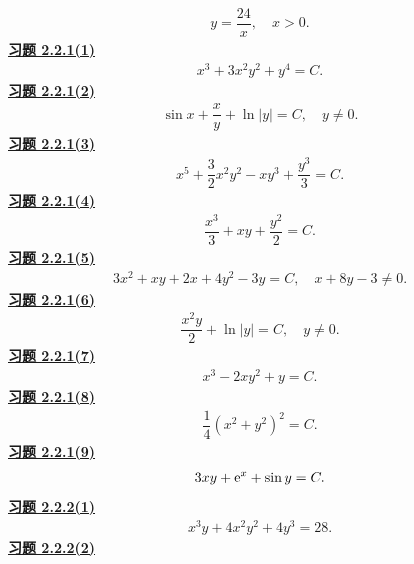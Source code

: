 \[\begin{gathered}y=\dfrac{24}{x},\quad x>0.\end{gathered}\]
\noindent\textbf{\hyperref[q:2.2.1(1)]{习题 2.2.1(1)}}
\[\begin{gathered}x^3+3x^2y^2+y^4=C.\end{gathered}\]
\noindent\textbf{\hyperref[q:2.2.1(2)]{习题 2.2.1(2)}}
\[\begin{gathered}\sin x+\dfrac xy+\ln|y|=C,\quad y\ne0.\end{gathered}\]
\noindent\textbf{\hyperref[q:2.2.1(3)]{习题 2.2.1(3)}}
\[\begin{gathered}x^5+\dfrac32x^2y^2-xy^3+\dfrac{y^3}{3}=C.\end{gathered}\]
\noindent\textbf{\hyperref[q:2.2.1(4)]{习题 2.2.1(4)}}
\[\begin{gathered}\dfrac{x^3}{3}+xy+\dfrac{y^2}{2}=C.\end{gathered}\]
\noindent\textbf{\hyperref[q:2.2.1(5)]{习题 2.2.1(5)}}
\[\begin{gathered}3x^2+xy+2x+4y^2-3y=C,\quad x+8y-3\ne0.\end{gathered}\]
\noindent\textbf{\hyperref[q:2.2.1(6)]{习题 2.2.1(6)}}
\[\begin{gathered}\dfrac{x^2y}{2}+\ln|y|=C,\quad y\ne0.\end{gathered}\]
\noindent\textbf{\hyperref[q:2.2.1(7)]{习题 2.2.1(7)}}
\[\begin{gathered}x^3-2xy^2+y=C.\end{gathered}\]
\noindent\textbf{\hyperref[q:2.2.1(8)]{习题 2.2.1(8)}}
\[\begin{gathered}\dfrac14(x^2+y^2)^2=C.\end{gathered}\]
\noindent\textbf{\hyperref[q:2.2.1(9)]{习题 2.2.1(9)}}
\[\begin{gathered}3xy+\mathrm e^x+\sin y=C.\end{gathered}\]
\noindent\textbf{\hyperref[q:2.2.2(1)]{习题 2.2.2(1)}}
\[\begin{gathered}x^3y+4x^2y^2+4y^3=28.\end{gathered}\]
\noindent\textbf{\hyperref[q:2.2.2(2)]{习题 2.2.2(2)}}
